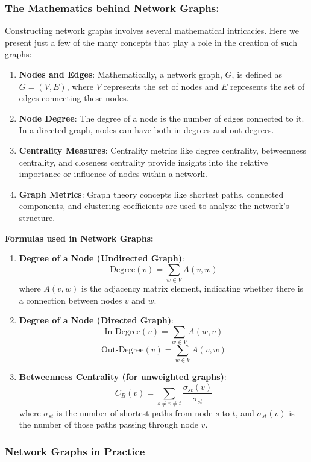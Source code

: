 \documentclass{article}\usepackage[]{graphicx}\usepackage[]{xcolor}
\begin{document}
\subsubsection{The Mathematics behind Network Graphs:}
Constructing network graphs involves several mathematical intricacies. Here we present just a few of the many concepts that play a role in the creation of such graphs:
\begin{enumerate}
\item \textbf{Nodes and Edges}: Mathematically, a network graph, \(G\), is defined as \(G = (V, E)\), where \(V\) represents the set of nodes and \(E\) represents the set of edges connecting these nodes.
\item \textbf{Node Degree}: The degree of a node is the number of edges connected to it. In a directed graph, nodes can have both in-degrees and out-degrees.
\item \textbf{Centrality Measures}: Centrality metrics like degree centrality, betweenness centrality, and closeness centrality provide insights into the relative importance or influence of nodes within a network.
\item \textbf{Graph Metrics}: Graph theory concepts like shortest paths, connected components, and clustering coefficients are used to analyze the network's structure.
\end{enumerate}

\textbf{Formulas used in Network Graphs:}

\begin{enumerate}
\item \textbf{Degree of a Node (Undirected Graph)}:
\[
\text{Degree}(v) = \sum_{w \in V} A(v, w)
\]
where \(A(v, w)\) is the adjacency matrix element, indicating whether there is a connection between nodes \(v\) and \(w\).
\item \textbf{Degree of a Node (Directed Graph)}:
\[
\text{In-Degree}(v) = \sum_{w \in V} A(w, v)
\]
\[
\text{Out-Degree}(v) = \sum_{w \in V} A(v, w)
\]
\item \textbf{Betweenness Centrality (for unweighted graphs)}:
\[
C_B(v) = \sum_{s \neq v \neq t} \frac{\sigma_{st}(v)}{\sigma_{st}}
\]
where \(\sigma_{st}\) is the number of shortest paths from node \(s\) to \(t\), and \(\sigma_{st}(v)\) is the number of those paths passing through node \(v\).
\end{enumerate}

\subsubsection{Network Graphs in Practice}
\end{document}
